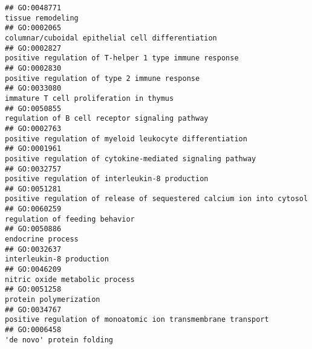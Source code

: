 \documentclass[
]{article}
\begin{document}
\begin{verbatim}
## GO:0048771                                                                                                                                tissue remodeling
## GO:0002065                                                                                                columnar/cuboidal epithelial cell differentiation
## GO:0002827                                                                                           positive regulation of T-helper 1 type immune response
## GO:0002830                                                                                                    positive regulation of type 2 immune response
## GO:0033080                                                                                                          immature T cell proliferation in thymus
## GO:0050855                                                                                                  regulation of B cell receptor signaling pathway
## GO:0002763                                                                                         positive regulation of myeloid leukocyte differentiation
## GO:0001961                                                                                       positive regulation of cytokine-mediated signaling pathway
## GO:0032757                                                                                                  positive regulation of interleukin-8 production
## GO:0051281                                                                           positive regulation of release of sequestered calcium ion into cytosol
## GO:0060259                                                                                                                   regulation of feeding behavior
## GO:0050886                                                                                                                                endocrine process
## GO:0032637                                                                                                                         interleukin-8 production
## GO:0046209                                                                                                                   nitric oxide metabolic process
## GO:0051258                                                                                                                           protein polymerization
## GO:0034767                                                                                    positive regulation of monoatomic ion transmembrane transport
## GO:0006458                                                                                                                        'de novo' protein folding

\end{verbatim}
\end{document}
